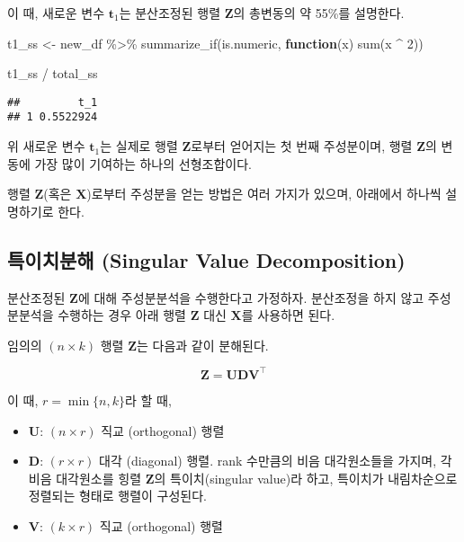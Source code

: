 \documentclass[
]{book}
\newenvironment{Shaded}{\begin{snugshade}}{\end{snugshade}}
\newcommand{\ControlFlowTok}[1]{\textcolor[rgb]{0.13,0.29,0.53}{\textbf{#1}}}
\newcommand{\DecValTok}[1]{\textcolor[rgb]{0.00,0.00,0.81}{#1}}
\newcommand{\FunctionTok}[1]{\textcolor[rgb]{0.00,0.00,0.00}{#1}}
\newcommand{\NormalTok}[1]{#1}
\newcommand{\OtherTok}[1]{\textcolor[rgb]{0.56,0.35,0.01}{#1}}
\newcommand{\SpecialCharTok}[1]{\textcolor[rgb]{0.00,0.00,0.00}{#1}}
\providecommand{\tightlist}{%
  \setlength{\itemsep}{0pt}\setlength{\parskip}{0pt}}
\begin{document}
이 때, 새로운 변수 \(\mathbf{t}_1\)는 분산조정된 행렬 \(\mathbf{Z}\)의 총변동의 약 55\%를 설명한다.

\begin{Shaded}
\begin{Highlighting}[]
\NormalTok{t1\_ss }\OtherTok{\textless{}{-}}\NormalTok{ new\_df }\SpecialCharTok{\%\textgreater{}\%}
  \FunctionTok{summarize\_if}\NormalTok{(is.numeric, }\ControlFlowTok{function}\NormalTok{(x) }\FunctionTok{sum}\NormalTok{(x }\SpecialCharTok{\^{}} \DecValTok{2}\NormalTok{))}

\NormalTok{t1\_ss }\SpecialCharTok{/}\NormalTok{ total\_ss}
\end{Highlighting}
\end{Shaded}

\begin{verbatim}
##         t_1
## 1 0.5522924
\end{verbatim}

위 새로운 변수 \(\mathbf{t}_1\)는 실제로 행렬 \(\mathbf{Z}\)로부터 얻어지는 첫 번째 주성분이며, 행렬 \(\mathbf{Z}\)의 변동에 가장 많이 기여하는 하나의 선형조합이다.

행렬 \(\mathbf{Z}\)(혹은 \(\mathbf{X}\))로부터 주성분을 얻는 방법은 여러 가지가 있으며, 아래에서 하나씩 설명하기로 한다.

\hypertarget{pca-svd}{%
\subsection{특이치분해 (Singular Value Decomposition)}\label{pca-svd}}

분산조정된 \(\mathbf{Z}\)에 대해 주성분분석을 수행한다고 가정하자. 분산조정을 하지 않고 주성분분석을 수행하는 경우 아래 행렬 \(\mathbf{Z}\) 대신 \(\mathbf{X}\)를 사용하면 된다.

임의의 \((n \times k)\) 행렬 \(\mathbf{Z}\)는 다음과 같이 분해된다.

\begin{equation}
\mathbf{Z} = \mathbf{U} \mathbf{D} \mathbf{V}^\top \label{eq:pca-svd}
\end{equation}

이 때, \(r = \min\{n, k\}\)라 할 때,

\begin{itemize}
\tightlist
\item
  \(\mathbf{U}\): \((n \times r)\) 직교 (orthogonal) 행렬
\item
  \(\mathbf{D}\): \((r \times r)\) 대각 (diagonal) 행렬. rank 수만큼의 비음 대각원소들을 가지며, 각 비음 대각원소를 힝렬 \(\mathbf{Z}\)의 특이치(singular value)라 하고, 특이치가 내림차순으로 정렬되는 형태로 행렬이 구성된다.
\item
  \(\mathbf{V}\): \((k \times r)\) 직교 (orthogonal) 행렬
\end{itemize}
\end{document}
